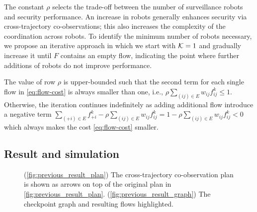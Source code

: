 \documentclass[10pt,twocolumn,twoside]{IEEEtran}
\begin{document}
The constant $\rho$ selects the trade-off between the number of surveillance robots and security performance. An increase in robots generally enhances security via cross-trajectory co-observations; this also increases the complexity of the coordination across robots. To identify the minimum number of robots necessary, we propose an iterative approach in which we start with $\mathcal{K}=1$ and gradually increase it until $F$ contains an empty flow, indicating the point where further additions of robots do not improve performance. 

\begin{remark} 
The value of row $\rho$ is upper-bounded such that the second term for each single flow in \eqref{eq:flow-cost} is always smaller than one, i.e., $ \rho \sum_{(ij)\in E} w_{ij} f^k_{ij}\leq 1$. Otherwise, the iteration continues indefinitely as adding additional flow introduce a negative term $\sum_{(+i)\in E} f^{k}_{+i} - \rho\sum_{(ij)\in E} w_{ij} f^k_{ij} = 1- \rho\sum_{(ij)\in E} w_{ij} f^k_{ij}<0$ which always makes the cost \eqref{eq:flow-cost} smaller.
\end{remark}

\subsection{Result and simulation}

\begin{figure}
  \centering
  \caption{(\ref{fig:previous_result_plan}) The cross-trajectory co-observation plan is shown as arrows on top of the original plan in \cref{fig:previous_result_plan}. (\ref{fig:previous_result_graph}) The checkpoint graph and resulting flows highlighted.}
  \label{fig:3-team-ctco}
\end{figure}
\end{document}
